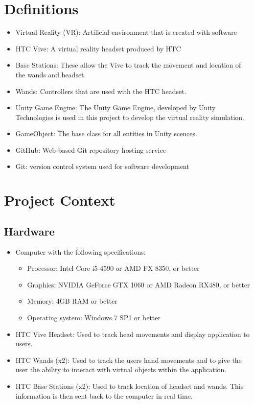 \documentclass[10pt,journal,compsoc,onecolumn, draftclsnofoot]{IEEEtran}
\begin{document}
\section{Definitions}
\begin{itemize}
  \item Virtual Reality (VR):  Artificial environment that is created with software
  \item HTC Vive: A virtual reality headset produced by HTC
  \item Base Stations: These allow the Vive to track the movement and location of the wands and headset.
  \item Wands: Controllers that are used with the HTC headset.
  \item Unity Game Engine: The Unity Game Engine, developed by Unity Technologies is used in this project to develop the virtual reality simulation.
  \item GameObject: The base class for all entities in Unity scences.
  \item GitHub: Web-based Git repository hosting service
  \item Git: version control system used for software development
\end{itemize}


\section{Project Context}
\subsection{Hardware}
\begin{itemize}
  \item Computer with the following specifications:
  \begin{itemize}
    \item Processor: Intel Core i5-4590 or AMD FX 8350, or better
    \item Graphics: NVIDIA GeForce GTX 1060 or AMD Radeon RX480, or better
    \item Memory: 4GB RAM or better
    \item Operating system: Windows 7 SP1 or better
  \end{itemize}
  \item HTC Vive Headset: Used to track head movements and display application to users.
  \item HTC Wands (x2): Used to track the users hand movements and to give the user the ability to interact with virtual objects within the application.
  \item HTC Base Stations (x2): Used to track location of headset and wands. This information is then sent back to the computer in real time.
\end{itemize}
\end{document}

